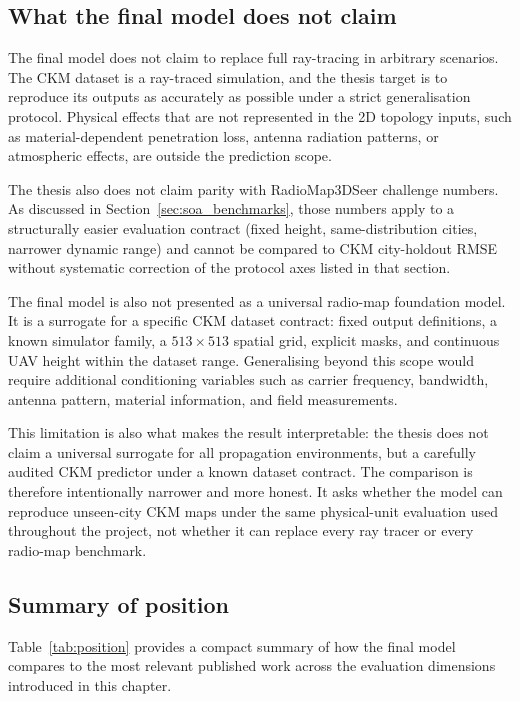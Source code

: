 \subsection{What the final model does not claim}

The final model does not claim to replace full ray-tracing in arbitrary scenarios. The
CKM dataset is a ray-traced simulation, and the thesis target is to reproduce
its outputs as accurately as possible under a strict generalisation protocol.
Physical effects that are not represented in the 2D topology inputs, such as
material-dependent penetration loss, antenna radiation patterns, or atmospheric
effects, are outside the prediction scope.

The thesis also does not claim parity with RadioMap3DSeer challenge numbers.
As discussed in Section~\ref{sec:soa_benchmarks}, those numbers apply to a
structurally easier evaluation contract (fixed height, same-distribution cities,
narrower dynamic range) and cannot be compared to CKM city-holdout RMSE without
systematic correction of the protocol axes listed in that section.

The final model is also not presented as a universal radio-map foundation model. It is a
surrogate for a specific CKM dataset contract: fixed output definitions, a
known simulator family, a \(513\times513\) spatial grid, explicit masks, and
continuous UAV height within the dataset range. Generalising beyond this scope
would require additional conditioning variables such as carrier frequency,
bandwidth, antenna pattern, material information, and field measurements.

This limitation is also what makes the result interpretable: the thesis does
not claim a universal surrogate for all propagation environments, but a
carefully audited CKM predictor under a known dataset contract. The comparison
is therefore intentionally narrower and more honest. It asks whether the model
can reproduce unseen-city CKM maps under the same physical-unit evaluation used
throughout the project, not whether it can replace every ray tracer or every
radio-map benchmark.

\subsection{Summary of position}

Table~\ref{tab:position} provides a compact summary of how the final model compares to
the most relevant published work across the evaluation dimensions introduced in
this chapter.

